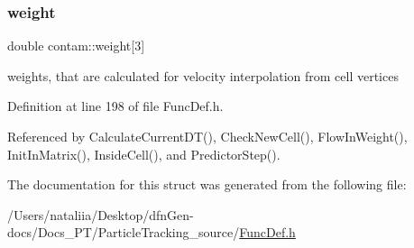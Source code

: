 \mbox{\label{structcontam_a5b317ab55ab5b48dc82c9a473c76a41e}} 
\subsubsection{\texorpdfstring{weight}{weight}}
{\footnotesize\ttfamily double contam\+::weight\mbox{[}3\mbox{]}}

weights, that are calculated for velocity interpolation from cell vertices 

Definition at line 198 of file Func\+Def.\+h.



Referenced by Calculate\+Current\+D\+T(), Check\+New\+Cell(), Flow\+In\+Weight(), Init\+In\+Matrix(), Inside\+Cell(), and Predictor\+Step().



The documentation for this struct was generated from the following file\+:\begin{DoxyCompactItemize}
\item 
/\+Users/nataliia/\+Desktop/dfn\+Gen-\/docs/\+Docs\+\_\+\+P\+T/\+Particle\+Tracking\+\_\+source/\mbox{\hyperlink{_func_def_8h}{Func\+Def.\+h}}\end{DoxyCompactItemize}

